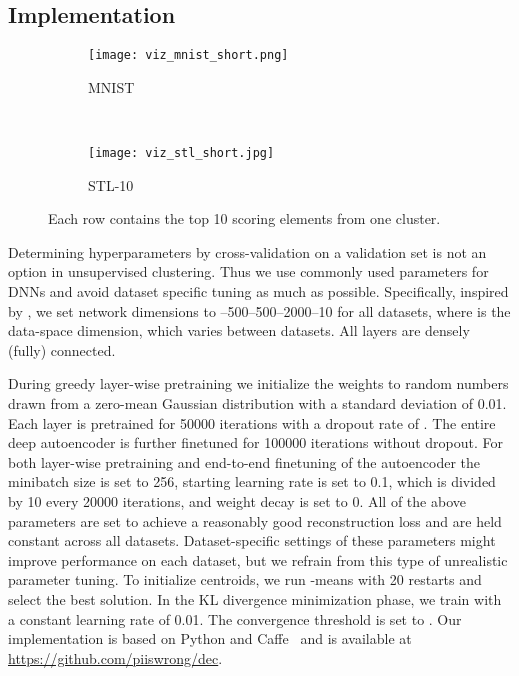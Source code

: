\documentclass{article}
\begin{document}
\subsection{Implementation}

\begin{figure*}[!ht]
\centering
\begin{subfigure}[t]{0.40\textwidth}
\centering
\texttt{[image: viz\_mnist\_short.png]}
\caption{MNIST}
\end{subfigure}
~\hspace{1cm}
\begin{subfigure}[t]{0.40\textwidth}
\centering
\texttt{[image: viz\_stl\_short.jpg]}
\caption{STL-10}
\end{subfigure}
\caption{Each row contains the top 10 scoring elements from one cluster.}
\label{fig:top10}
\end{figure*}

Determining hyperparameters by cross-validation on a validation set is not an option in unsupervised clustering.
Thus we use commonly used parameters for DNNs and avoid dataset specific tuning as much as possible.
Specifically, inspired by \citet{maaten2009learning}, we set network dimensions to --500--500--2000--10 for all datasets, where  is the data-space dimension, which varies between datasets.
All layers are densely (fully) connected.

During greedy layer-wise pretraining we initialize the weights to random numbers drawn from a zero-mean Gaussian distribution with a standard deviation of 0.01.
Each layer is pretrained for 50000 iterations with a dropout rate of .
The entire deep autoencoder is further finetuned for 100000 iterations without dropout.
For both layer-wise pretraining and end-to-end finetuning of the autoencoder the minibatch size is set to 256, starting learning rate is set to 0.1, which is divided by 10 every 20000 iterations, and weight decay is set to 0.
All of the above parameters are set to achieve a reasonably good reconstruction loss and are held constant across all datasets.
Dataset-specific settings of these parameters might improve performance on each dataset, but we refrain from this type of unrealistic parameter tuning.
To initialize centroids, we run -means with 20 restarts and select the best solution.
In the KL divergence minimization phase, we train with a constant learning rate of 0.01.
The convergence threshold is set to .
Our implementation is based on Python and Caffe~\citep{jia2014caffe} and is available at \url{https://github.com/piiswrong/dec}.
\end{document}
